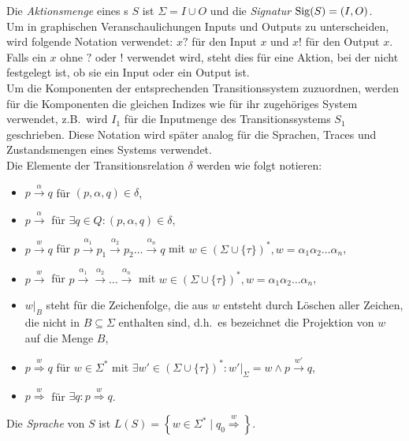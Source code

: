 Die \emph{Aktionsmenge} eines \EIO{}s $S$ ist $\Sigma = I\cup O$ und die
\emph{Signatur} $\mathrm{Sig}(S)=(I,O)$.\\
Um in graphischen Veranschaulichungen Inputs und Outputs zu unterscheiden, wird
folgende Notation verwendet: $x?$ für den Input $x$ und $x!$ für den Output
$x$. Falls ein $x$ ohne $?$ oder $!$ verwendet wird, steht dies für eine
Aktion, bei der nicht festgelegt ist, ob sie ein Input oder ein Output ist.\\
Um die Komponenten der entsprechenden Transitionssystem zuzuordnen, werden für
die Komponenten die gleichen Indizes wie für ihr zugehöriges System verwendet,
z.B.\ wird $I_1$ für die Inputmenge des Transitionssystems $S_1$ geschrieben. Diese
Notation wird später analog für die Sprachen, Traces und Zustandsmengen eines
Systems verwendet.\\
Die Elemente der Transitionsrelation $\delta$ werden wie folgt notieren:
\begin{itemize}
  \item $p\overset{\alpha}{\rightarrow} q$ für $(p,\alpha ,q)\in\delta$,
  \item $p\overset{\alpha}{\rightarrow}$ für $\exists q \in Q: (p,\alpha ,q)\in\delta$,
  \item $p\overset{w}{\rightarrow} q$ für $p \overset{\alpha _1}{\longrightarrow}
    p_1 \overset{\alpha _2}{\longrightarrow} p_2\dots \overset{\alpha
    _n}{\longrightarrow} q$ mit $w\in \left(\Sigma\cup\{\tau\}\right)^*, w=\alpha _1\alpha
    _2\dots \alpha _n$,
  \item $p\overset{w}{\rightarrow}$ für $p \overset{\alpha _1}{\longrightarrow}
    \overset{\alpha _2}{\longrightarrow} \dots \overset{\alpha _n}{\longrightarrow}$
    mit $w\in \left(\Sigma\cup\{\tau\}\right)^*, w=\alpha _1\alpha _2\dots \alpha _n$,
  \item $w|_B$ steht für die Zeichenfolge, die aus $w$ entsteht durch Löschen
    aller Zeichen, die nicht in $B\subseteq\Sigma$ enthalten sind, d.h.\ es
    bezeichnet die Projektion von $w$ auf die Menge $B$,
  \item $p\overset{w}{\Rightarrow} q$ für $w\in\Sigma^*$ mit $\exists
    w'\in\left(\Sigma\cup\{\tau\}\right)^*:w'|_{\Sigma}=w\wedge p\overset{w'}{\rightarrow}
    q$,
  \item $p\overset{w}{\Rightarrow}$ für $\exists q:p\overset{w}{\Rightarrow}
    q$.
\end{itemize}
Die \emph{Sprache} von $S$ ist
$L(S)=\left\{w\in\Sigma^*\mid q_0\overset{w}{\Rightarrow}\right\}$.

